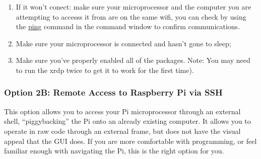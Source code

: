 \documentclass{article}\usepackage[]{graphicx}\usepackage[]{color}
\begin{document}
\begin{enumerate}
\item If it won't conect: make sure your microprocessor and the computer you are attempting to accesss it from are on the same wifi, you can check by using the \hyperlink{ping}{ping} command in the command window to confirm communications.

\item Make sure your microprocessor is connected and hasn't gone to sleep;

\item Make sure you've properly enabled all of the packages. Note: You may need to run the  xrdp twice to get it to work for the first time).  

\end{enumerate}

\subsubsection{Option 2B: Remote Access to Raspberry Pi via SSH}

This option allows you to access your Pi microprocessor through an external shell, ``piggybacking'' the Pi onto an already existing computer.  It allows you to operate in raw code through an external frame, but does not have the visual appeal that the GUI does.  If you are more comfortable with programming, or feel familiar enough with navigating the Pi, this is the right option for you.
\end{document}
